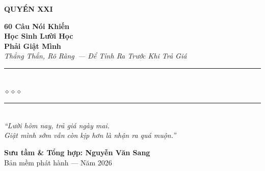 \begin{titlepage}
\begin{center}
  \begin{tcolorbox}[
    width=6.5cm,
    colback=accentsgold!20,
    colframe=accentsgold!80!black,
    arc=4pt,
    boxrule=1.5pt,
    halign=center
  ]
    {\fontsize{18}{22}\selectfont\bfseries\color{inkdark!80!black}
     QUYỂN XXI}
  \end{tcolorbox}
  \vspace{0.8cm}

  {\fontsize{28}{34}\selectfont\bfseries\color{inkdark!80!black}
    60 Câu Nói Khiến}\\[0.4cm]
  {\fontsize{28}{34}\selectfont\bfseries\color{accentsgold!80!black}
    Học Sinh Lười Học}\\[0.4cm]
  {\fontsize{28}{34}\selectfont\bfseries\color{inkdark!80!black}
    Phải Giật Mình}\\[0.4cm]

  {\fontsize{16}{20}\selectfont\color{accentsgold!90!black}\itshape
    Thẳng Thắn, Rõ Ràng~--- Để Tỉnh Ra Trước Khi Trả Giá}\\[1cm]

  {\color{darkred!60}\rule{6cm}{1pt}}\\[5pt]
  {\color{accentsgold!80!black}\large$\diamond$\hspace{1cm}$\diamond$\hspace{1cm}$\diamond$}\\[5pt]
  {\color{darkred!60}\rule{6cm}{1pt}}\\[1.5cm]

  {\normalsize\itshape\color{darkred!90!black}
   ``Lười hôm nay, trả giá ngày mai.\\
   Giật mình sớm vẫn còn kịp hơn là nhận ra quá muộn.''}

  \vfill

  {\fontsize{16}{20}\selectfont\bfseries\color{darkred!90!black}
    Sưu tầm \& Tổng hợp: \textbf{Nguyễn Văn Sang}}\\[0.4cm]

  {\small\color{gray} Bản mềm phát hành --- Năm 2026}\\[0.5cm]
\end{center}

\afterpage{\nopagecolor}
\end{titlepage}